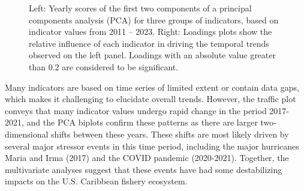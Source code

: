 \documentclass[
  letterpaper,
  oneside,
  open=any]{scrbook}
\begin{document}
\begin{figure}


\caption{\label{fig-PCA}Left: Yearly scores of the first two components
of a principal components analysis (PCA) for three groups of indicators,
based on indicator values from 2011 -- 2023. Right: Loadings plots show
the relative influence of each indicator in driving the temporal trends
observed on the left panel. Loadings with an absolute value greater than
0.2 are considered to be significant.}

\end{figure}%

Many indicators are based on time series of limited extent or contain
data gaps, which makes it challenging to elucidate overall trends.
However, the traffic plot conveys that many indicator values undergo
rapid change in the period 2017-2021, and the PCA biplots confirm these
patterns as there are larger two-dimensional shifts between these years.
These shifts are most likely driven by several major stressor events in
this time period, including the major hurricanes Maria and Irma (2017)
and the COVID pandemic (2020-2021). Together, the multivariate analyses
suggest that these events have had some destabilizing impacts on the
U.S. Caribbean fishery ecosystem.
\end{document}
